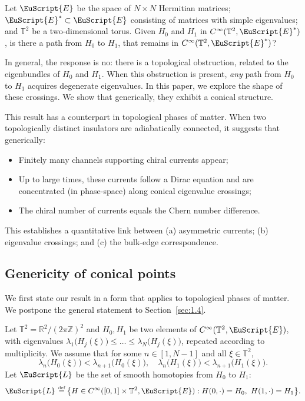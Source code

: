 \documentclass[JEP,XML,SOM,Unicode,NoFloatCountersInSection]{cedram}
\let\pazocal\EuScript
\let\sep:
\theoremstyle{definition}
\newcommand{\EE}{\pazocal{E}}
\newcommand{\LL}{{\pazocal{L}}}
\newcommand{\R}{\mathbb{R}}
\newcommand{\Z}{\mathbb{Z}}
\newcommand{\Tt}{{\mathbb{T}}}
\newcommand{\de}{\,\mathrel{\stackrel{\makebox[0pt]{\mbox{\normalfont\tiny def}}}{=}}}
\begin{document}
Let $\EE$ be the space of $N \times N$ Hermitian matrices; $\EE^* \subset \EE$ consisting of matrices with simple eigenvalues; and $\Tt^2$ be a two-dimensional torus. Given $H_0$ and $H_1$ in $C^\infty(\Tt^2,\EE^*)$, is there a path from $H_0$ to $H_1$, that remains in $C^\infty(\Tt^2,\EE^*)$?

In general, the response is no: there is a topological obstruction, related to the eigenbundles of $H_0$ and $H_1$. When this obstruction is present, \textit{any} path from $H_0$ to $H_1$ acquires degenerate eigenvalues. In this paper, we explore the shape of these crossings. We show that generically, they exhibit a conical structure.

This result has a counterpart in topological phases of matter. When two topologically distinct insulators are adiabatically connected, it suggests that generically:
\begin{itemize}
\item Finitely many channels supporting chiral currents appear;
\item Up to large times, these currents follow a Dirac equation and are concentrated (in phase-space) along conical eigenvalue crossings;
\item The chiral number of currents equals the Chern number difference.
\end{itemize}
This establishes a quantitative link between (a) asymmetric currents; (b) eigenvalue crossings; and (c) the bulk-edge correspondence.

\subsection{Genericity of conical points}\label{sec:1.1} We first state our result in a form that applies to topological phases of matter. We postpone the general statement to Section~\ref{sec:1.4}.

Let $\Tt^2 = \R^2/(2\pi\Z)^2$ and $H_0, H_1$ be two elements of $C^\infty(\Tt^2,\EE)$, with eigenvalues $\lambda_1\bigl( H_j(\xi) \bigr) \leq \dots \leq \lambda_N\bigl( H_j(\xi) \bigr)$, repeated according to multiplicity. We assume that for some $n \in [1,N-1]$ and all $\xi \in \Tt^2$,
\begin{equation}\label{eq:1e}
\lambda_n\bigl(H_0(\xi)\bigr) < \lambda_{n+1}\bigl(H_0(\xi)\bigr), \quad \lambda_n\bigl(H_1(\xi)\bigr) < \lambda_{n+1}\bigl(H_1(\xi)\bigr).
\end{equation}
Let $\LL$ be the set of smooth homotopies from $H_0$ to $H_1$:
\begin{equation*}
\LL \de \bigl\{ H \in C^\infty([0,1] \times \Tt^2, \EE)\sep H(0,\cdot) = H_0, \ H(1,\cdot) = H_1\bigr\}.
\end{equation*}
\end{document}
